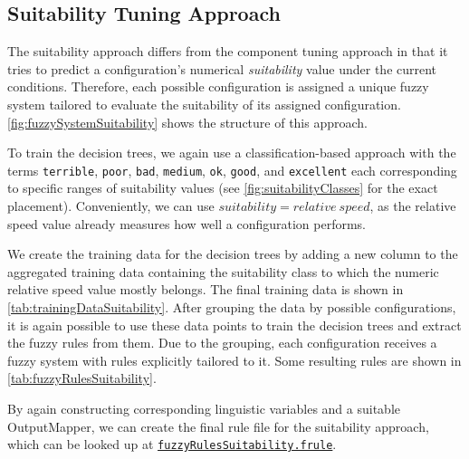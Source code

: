 \newpage

\subsection{Suitability Tuning Approach}

The suitability approach differs from the component tuning approach in that it tries to predict a configuration's numerical \emph{suitability} value under the current conditions. Therefore, each possible configuration is assigned a unique fuzzy system tailored to evaluate the suitability of its assigned configuration. \autoref{fig:fuzzySystemSuitability} shows the structure of this approach.

\smallskip

To train the decision trees, we again use a classification-based approach with the terms \texttt{terrible}, \texttt{poor}, \texttt{bad}, \texttt{medium}, \texttt{ok}, \texttt{good}, and \texttt{excellent} each corresponding to specific ranges of suitability values (see \autoref{fig:suitabilityClasses} for the exact placement). Conveniently, we can use $suitability = relative \ speed$, as the relative speed value already measures how well a configuration performs.

\smallskip

We create the training data for the decision trees by adding a new column to the aggregated training data containing the suitability class to which the numeric relative speed value mostly belongs. The final training data is shown in \autoref{tab:trainingDataSuitability}. After grouping the data by possible configurations, it is again possible to use these data points to train the decision trees and extract the fuzzy rules from them. Due to the grouping, each configuration receives a fuzzy system with rules explicitly tailored to it. Some resulting rules are shown in \autoref{tab:fuzzyRulesSuitability}.

\medskip

\noindent By again constructing corresponding linguistic variables and a suitable OutputMapper, we can create the final rule file for the suitability approach, which can be looked up at \href{https://github.com/AutoPas/AutoPas/blob/f77f10f72c19a86d5471bce287ae3a4ae344c012/examples/md-flexible/input/fuzzyRulesSuitability.frule}{\color{blue}\texttt{fuzzyRulesSuitability.frule}}.

